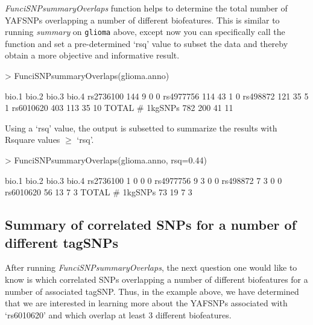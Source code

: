 \documentclass[12pt,fullpage]{article}
\newcommand{\Robject}[1]{{\texttt{#1}}}
\newcommand{\Rmethod}[1]{{\textit{#1}}}
\begin{document}
\Rmethod{FunciSNPsummaryOverlaps} function helps to determine the
total number of YAFSNPs overlapping a number of different biofeatures. This
is similar to running \Rmethod{summary} on \Robject{glioma} above, except now
you can specifically call the function and set a pre-determined `rsq' value to
subset the data and thereby obtain a more objective and informative result.

\begin{Schunk}
\begin{Sinput}
> FunciSNPsummaryOverlaps(glioma.anno)
\end{Sinput}
\begin{Soutput}
                bio.1 bio.2 bio.3 bio.4
rs2736100         144     9     0     0
rs4977756         114    43     1     0
rs498872          121    35     5     1
rs6010620         403   113    35    10
TOTAL # 1kgSNPs   782   200    41    11
\end{Soutput}
\end{Schunk}

Using a `rsq' value, the output is subsetted to summarize the results with 
Rsquare values $\ge$ `rsq'.

\begin{Schunk}
\begin{Sinput}
> FunciSNPsummaryOverlaps(glioma.anno, rsq=0.44)
\end{Sinput}
\begin{Soutput}
                bio.1 bio.2 bio.3 bio.4
rs2736100           1     0     0     0
rs4977756           9     3     0     0
rs498872            7     3     0     0
rs6010620          56    13     7     3
TOTAL # 1kgSNPs    73    19     7     3
\end{Soutput}
\end{Schunk}

\subsection{Summary of correlated SNPs for a number of different tagSNPs}

After running \Rmethod{FunciSNPsummaryOverlaps}, the next question one would
like to know is which correlated SNPs overlapping a number of different
biofeatures for a number of associated tagSNP. Thus, in the example above, we
have determined that we are interested in learning more about the YAFSNPs
associated with `rs6010620' and which overlap at least 3 different biofeatures.
\end{document}
